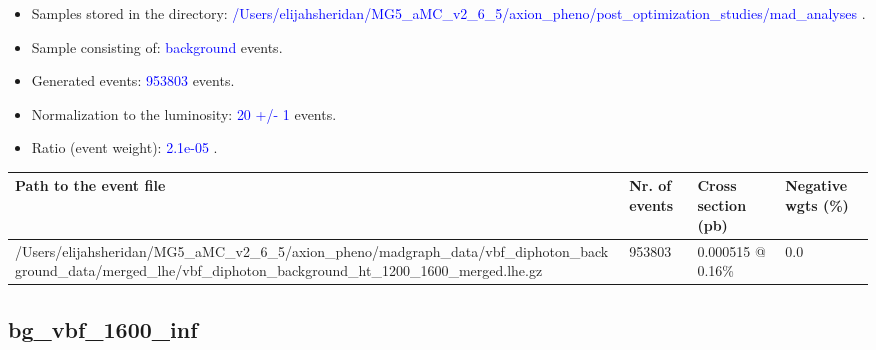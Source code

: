 \documentclass[a4paper, 10pt]{article}
\begin{document}
\begin{itemize}
  \item Samples stored in the directory: \textcolor{blue}{/\-Users/\-elijahsheridan/\-MG5\_aMC\_v2\_6\_5/\-axion\_pheno/\-post\_optimization\_studies/\-mad\_analyses} .
   \item Sample consisting of: \textcolor{blue}{background}  events.
   \item Generated events: \textcolor{blue}{953803 }  events.
   \item Normalization to the luminosity: \textcolor{blue}{20}\textcolor{blue}{ +/\-- }\textcolor{blue}{1 }  events.
   \item Ratio (event weight): \textcolor{blue}{2.1e-05 } .  
 
\end{itemize}
\begin{table}[H]
  \begin{center}
    \begin{tabular}{|m{55.0mm}|m{25.0mm}|m{30.0mm}|m{30.0mm}|}
      \hline
      {\cellcolor{yellow}         Path to the event file}& {\cellcolor{yellow}         Nr. of events}& {\cellcolor{yellow}         Cross section (pb)}& {\cellcolor{yellow}         Negative wgts (\%)}\\
      \hline
      {\cellcolor{white}          /\-Users/\-elijahsheridan/\-MG5\_aMC\_v2\_6\_5/\-axion\_pheno/\-madgraph\_data/\-vbf\_diphoton\_background\_data/\-merged\_lhe/\-vbf\_diphoton\_background\_ht\_1200\_1600\_merged.lhe.gz}& {\cellcolor{white}          953803}& {\cellcolor{white}          0.000515 @ 0.16\%}& {\cellcolor{white}          0.0}\\
\hline
    \end{tabular}
  \end{center}
\end{table}

\subsection{ bg\_vbf\_1600\_inf}
\end{document}
